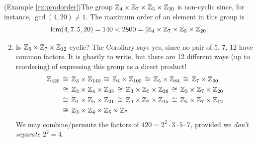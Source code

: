 \begin{examples}{}{}
	\exstart (Example \ref{ex:prodorder})\lstsp The group $\mathbb{Z}_4\times\mathbb{Z}_7\times\mathbb{Z}_5\times\mathbb{Z}_{20}$ is non-cyclic since, for instance, $\gcd(4,20)\neq 1$. The maximum order of an element in this group is
	\[
		\operatorname{lcm}(4,7,5,20)=140<2800=\left| \mathbb{Z}_4\times\mathbb{Z}_7\times\mathbb{Z}_5\times\mathbb{Z}_{20}\right|
	\]
	\begin{enumerate}\setcounter{enumi}{1}
	  \item Is $\mathbb{Z}_5\times\mathbb{Z}_7\times\mathbb{Z}_{12}$ cyclic? The Corollary says yes, since no pair of 5, 7, 12 have common factors. It is ghastly to write, but there are 12 different ways (up to reordering) of expressing this group as a direct product!
		\begin{align*}
			\mathbb{Z}_{420}\,&\cong\, \mathbb{Z}_3\times\mathbb{Z}_{140} \,\cong\, \mathbb{Z}_4\times\mathbb{Z}_{105} \,\cong\, \mathbb{Z}_5\times\mathbb{Z}_{84} \,\cong\, \mathbb{Z}_{7}\times\mathbb{Z}_{60}\\
			&\cong\, \mathbb{Z}_3\times\mathbb{Z}_4\times\mathbb{Z}_{35} \,\cong\, \mathbb{Z}_3\times\mathbb{Z}_5\times\mathbb{Z}_{28} \,\cong\, \mathbb{Z}_3\times\mathbb{Z}_7\times\mathbb{Z}_{20}\\
			&\cong\, \mathbb{Z}_4\times\mathbb{Z}_5\times\mathbb{Z}_{21} \,\cong\, \mathbb{Z}_4\times\mathbb{Z}_7\times\mathbb{Z}_{15} \,\cong\, \mathbb{Z}_5\times\mathbb{Z}_7\times\mathbb{Z}_{12}\\
			&\cong\, \mathbb{Z}_3\times\mathbb{Z}_4\times\mathbb{Z}_5\times\mathbb{Z}_7
		\end{align*}
		We may combine/permute the factors of $420=2^2\cdot 3\cdot 5\cdot 7$, provided we \emph{don't separate $2^2=4$.}
  
	\end{enumerate}
\end{examples}


